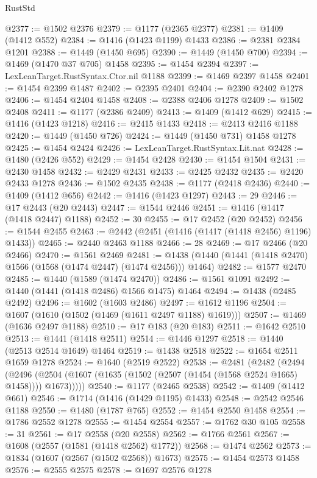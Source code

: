 \begin{lexlean}{RustStd}
\begin{coremodule}
{\begin{coremodule}
{{{{{{{{{{{{{{{{{{{{{{{{{{{{{{{@2377 := @1502 @2376
@2379 := @1177 (@2365 @2377)
@2381 := @1409 (@1412 @552)
@2384 := @1416 (@1423 @1199) @1433
@2386 := @2381 @2384 @1201
@2388 := @1449 (@1450 @695)
@2390 := @1449 (@1450 @700)
@2394 := @1469 (@1470 @37 @705) @1458
@2395 := @1454 @2394
@2397 := LexLeanTarget.RustSyntax.Ctor.nil @1188
@2399 := @1469 @2397 @1458
@2401 := @1454 @2399 @1487
@2402 := @2395 @2401
@2404 := @2390 @2402 @1278
@2406 := @1454 @2404 @1458
@2408 := @2388 @2406 @1278
@2409 := @1502 @2408
@2411 := @1177 (@2386 @2409)
@2413 := @1409 (@1412 @629)
@2415 := @1416 (@1423 @1218)
@2416 := @2415 @1433
@2418 := @2413 @2416 @1188
@2420 := @1449 (@1450 @726)
@2424 := @1449 (@1450 @731) @1458 @1278
@2425 := @1454 @2424
@2426 := LexLeanTarget.RustSyntax.Lit.nat
@2428 := @1480 (@2426 @552)
@2429 := @1454 @2428
@2430 := @1454 @1504
@2431 := @2430 @1458
@2432 := @2429 @2431
@2433 := @2425 @2432
@2435 := @2420 @2433 @1278
@2436 := @1502 @2435
@2438 := @1177 (@2418 @2436)
@2440 := @1409 (@1412 @656)
@2442 := @1416 (@1423 @1297)
@2443 := 29
@2446 := @17 @2443 (@20 @2443)
@2447 := @1544 @2446
@2451 := @1416 (@1417 (@1418 @2447) @1188)
@2452 := 30
@2455 := @17 @2452 (@20 @2452)
@2456 := @1544 @2455
@2463 := @2442 (@2451 (@1416 (@1417 (@1418 @2456) @1196) @1433))
@2465 := @2440 @2463 @1188
@2466 := 28
@2469 := @17 @2466 (@20 @2466)
@2470 := @1561 @2469
@2481 := @1438 (@1440 (@1441 (@1418 @2470) @1566 (@1568 (@1474 @2447) (@1474 @2456))) @1464)
@2482 := @1577 @2470
@2485 := @1440 (@1589 (@1474 @2470))
@2486 := @1561 @1091
@2492 := @1440 (@1441 (@1418 @2486) @1566 @1475) @1464
@2494 := @1438 (@2485 @2492)
@2496 := @1602 (@1603 @2486)
@2497 := @1612 @1196
@2504 := @1607 (@1610 (@1502 (@1469 (@1611 @2497 @1188) @1619)))
@2507 := @1469 (@1636 @2497 @1188)
@2510 := @17 @183 (@20 @183)
@2511 := @1642 @2510
@2513 := @1441 (@1418 @2511)
@2514 := @1446 @1297
@2518 := @1440 (@2513 @2514 @1649) @1464
@2519 := @1438 @2518
@2522 := @1654 @2511 @1659 @1278
@2524 := @1640 (@2519 @2522)
@2538 := @2481
    (@2482
      (@2494
        (@2496 (@2504 (@1607 (@1635 (@1502 (@2507 (@1454 (@1568 @2524 @1665) @1458)))) @1673)))))
@2540 := @1177 (@2465 @2538)
@2542 := @1409 (@1412 @661)
@2546 := @1714 (@1416 (@1429 @1195) @1433)
@2548 := @2542 @2546 @1188
@2550 := @1480 (@1787 @765)
@2552 := @1454 @2550 @1458
@2554 := @1786 @2552 @1278
@2555 := @1454 @2554
@2557 := @1762 @30 @105
@2558 := 31
@2561 := @17 @2558 (@20 @2558)
@2562 := @1766 @2561
@2567 := @1608 (@2557 (@1581 (@1418 @2562) @1772))
@2568 := @1474 @2562
@2573 := @1834 (@1607 (@2567 (@1502 @2568)) @1673)
@2575 := @1454 @2573 @1458
@2576 := @2555 @2575
@2578 := @1697 @2576 @1278
}}}}}}}}}}}}}}}}}}}}}}}}}}}}}}}
\end{coremodule}}
\end{coremodule}
\end{lexlean}
